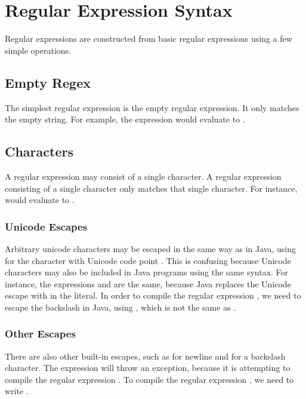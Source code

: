 \section{Regular Expression Syntax}

Regular expressions are constructed from basic regular expressions
using a few simple operations.  

\subsection{Empty Regex}

The simplest regular expression is the empty regular expression.  It
only matches the empty string.  For example, the expression
 would evaluate to
.

\subsection{Characters}

A regular expression may consist of a single character.  A regular
expression consisting of a single character only matches that single
character.  For instance,
 would evaluate to
.

\subsubsection{Unicode Escapes}

Arbitrary unicode characters may be escaped in the same way as in
Java, using  for the character with Unicode
code point .  This is confusing because
Unicode characters may also be included in Java programs using the
same syntax.  For instance, the expressions
 and 
are the same, because Java replaces the Unicode escape
 with  in the literal.  In order to compile
the regular expression , we need to escape the
backslash in Java, using ,
which is not the same as .

\subsubsection{Other Escapes}

There are also other built-in escapes, such as  for
newline and \code{{\bk}{\bk}} for a backslash character.  The expression
 will throw an exception, because
it is attempting to compile the regular expression \code{{\bk}}.  To
compile the regular expression \code{{\bk}{\bk}}, we need to write
.  

